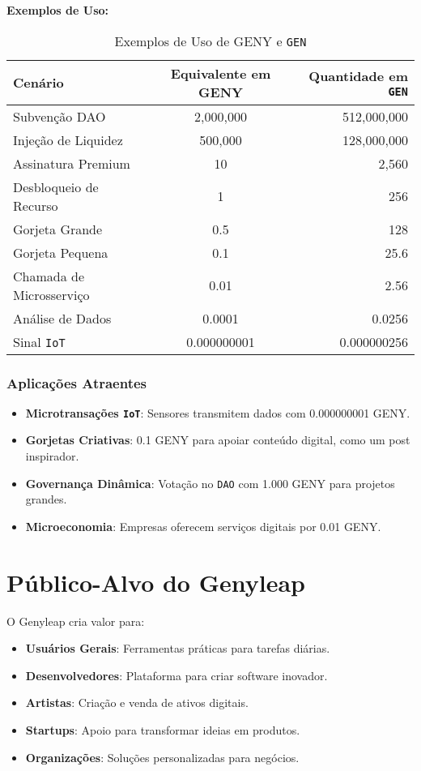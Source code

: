 \documentclass[a4paper,12pt,openany]{book}
\begin{document}
\textbf{Exemplos de Uso:}
\begin{table}[h]
\centering
\caption{Exemplos de Uso de GENY e \texttt{GEN}}
\small
\begin{tabular}{l c r}
\hline
\textbf{Cenário} & \textbf{Equivalente em GENY} & \textbf{Quantidade em \texttt{GEN}} \\
\hline
Subvenção DAO & 2,000,000 & 512,000,000 \\
Injeção de Liquidez & 500,000 & 128,000,000 \\
Assinatura Premium & 10 & 2,560 \\
Desbloqueio de Recurso & 1 & 256 \\
Gorjeta Grande & 0.5 & 128 \\
Gorjeta Pequena & 0.1 & 25.6 \\
Chamada de Microsserviço & 0.01 & 2.56 \\
Análise de Dados & 0.0001 & 0.0256 \\
Sinal \texttt{IoT} & 0.000000001 & 0.000000256 \\
\hline
\end{tabular}
\end{table}

\subsection*{Aplicações Atraentes}
\begin{itemize}
    \item \textbf{Microtransações \texttt{IoT}}: Sensores transmitem dados com 0.000000001 GENY.
    \item \textbf{Gorjetas Criativas}: 0.1 GENY para apoiar conteúdo digital, como um post inspirador.
    \item \textbf{Governança Dinâmica}: Votação no \texttt{DAO} com 1.000 GENY para projetos grandes.
    \item \textbf{Microeconomia}: Empresas oferecem serviços digitais por 0.01 GENY.
\end{itemize}

\chapter{Público-Alvo do Genyleap}
O Genyleap cria valor para:
\begin{itemize}
    \item \textbf{Usuários Gerais}: Ferramentas práticas para tarefas diárias.
    \item \textbf{Desenvolvedores}: Plataforma para criar software inovador.
    \item \textbf{Artistas}: Criação e venda de ativos digitais.
    \item \textbf{Startups}: Apoio para transformar ideias em produtos.
    \item \textbf{Organizações}: Soluções personalizadas para negócios.
\end{itemize}
\end{document}
